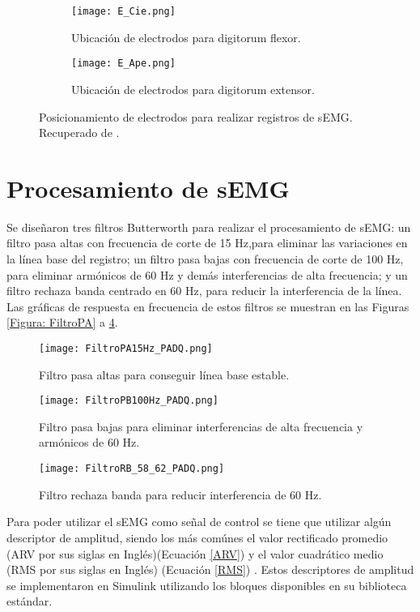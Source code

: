 \begin{figure}[htbp]
	\centering
	\begin{subfigure}[htbp]{0.3\textwidth}
		\texttt{[image: E\_Cie.png]}
		\caption{Ubicación de electrodos para digitorum flexor.}
		\label{Figura: E_Cie}
	\end{subfigure}
	\hfill
	\begin{subfigure}[htbp]{0.3\textwidth}
		\texttt{[image: E\_Ape.png]}
		\caption{Ubicación de electrodos para digitorum extensor.}
		\label{Figura: E_Ape}
	\end{subfigure}
	\caption{Posicionamiento de electrodos para realizar registros de sEMG. Recuperado de \cite{Cavalcanti-Garcia2009}.}
	\label{Figura: E_sEMG}
\end{figure}

\section{Procesamiento de sEMG}

Se diseñaron tres filtros Butterworth para realizar el procesamiento de sEMG: un filtro pasa altas con frecuencia de corte de 15 Hz,para eliminar las variaciones en la línea base del registro; un filtro pasa bajas con frecuencia de corte de 100 Hz, para eliminar armónicos de 60 Hz y demás interferencias de alta frecuencia; y un filtro rechaza banda centrado en 60 Hz, para reducir la interferencia de la línea. Las gráficas de respuesta en frecuencia de estos filtros se muestran en las Figuras \ref{Figura: FiltroPA} a \ref{Figura: FiltroRB}.


\begin{figure}[htbp]
	\centering
	\texttt{[image: FiltroPA15Hz\_PADQ.png]}
	\caption{Filtro pasa altas para conseguir línea base estable.}
	\label{Figura: FiltroPA}
	
	\texttt{[image: FiltroPB100Hz\_PADQ.png]}
	\caption{Filtro pasa bajas para eliminar interferencias de alta frecuencia y armónicos de 60 Hz.} 
	\label{Figura: FiltroPB}
	
	\texttt{[image: FiltroRB\_58\_62\_PADQ.png]}
	\caption{Filtro rechaza banda para reducir interferencia de 60 Hz.}
	\label{Figura: FiltroRB}
\end{figure}

\newpage
Para poder utilizar el sEMG como señal de control se tiene que utilizar algún descriptor de amplitud, siendo los más comúnes el valor rectificado promedio (ARV por sus siglas en Inglés)(Ecuación \ref{ARV}) y el valor cuadrático medio (RMS por sus siglas en Inglés) (Ecuación \ref{RMS}) \cite{Cavalcanti-Garcia2009}. Estos descriptores de amplitud se implementaron en Simulink utilizando los bloques disponibles en su biblioteca estándar.

